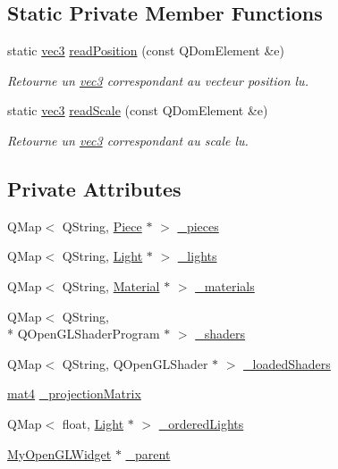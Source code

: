 \subsection*{Static Private Member Functions}
\begin{DoxyCompactItemize}
\item 
static \hyperlink{structvec3}{vec3} \hyperlink{class_scene_a98d11f40f1ac651eae91827ae9ef3d5c}{read\+Position} (const Q\+Dom\+Element \&e)
\begin{DoxyCompactList}\small\item\em Retourne un \hyperlink{structvec3}{vec3} correspondant au vecteur position lu. \end{DoxyCompactList}\item 
static \hyperlink{structvec3}{vec3} \hyperlink{class_scene_a2ea5cfec3f9be76fe110cba255621d7e}{read\+Scale} (const Q\+Dom\+Element \&e)
\begin{DoxyCompactList}\small\item\em Retourne un \hyperlink{structvec3}{vec3} correspondant au scale lu. \end{DoxyCompactList}\end{DoxyCompactItemize}
\subsection*{Private Attributes}
\begin{DoxyCompactItemize}
\item 
Q\+Map$<$ Q\+String, \hyperlink{class_piece}{Piece} $\ast$ $>$ \hyperlink{class_scene_aa3a488d4be41fe6a187488e1e7a1035c}{\+\_\+pieces}
\item 
Q\+Map$<$ Q\+String, \hyperlink{class_light}{Light} $\ast$ $>$ \hyperlink{class_scene_a0ef33120973d6afc1754d2154d7c338a}{\+\_\+lights}
\item 
Q\+Map$<$ Q\+String, \hyperlink{class_material}{Material} $\ast$ $>$ \hyperlink{class_scene_a5b96810fdeb47632d5ce6c2c47f41691}{\+\_\+materials}
\item 
Q\+Map$<$ Q\+String, \\*
Q\+Open\+G\+L\+Shader\+Program $\ast$ $>$ \hyperlink{class_scene_abde34dc03c8d3a07b3177041ab195f07}{\+\_\+shaders}
\item 
Q\+Map$<$ Q\+String, Q\+Open\+G\+L\+Shader $\ast$ $>$ \hyperlink{class_scene_a57117e4269465f070fb412f338d28bf4}{\+\_\+loaded\+Shaders}
\item 
\hyperlink{structmat4}{mat4} \hyperlink{class_scene_a7db3394191c0a07e6bdc456a53ac8ece}{\+\_\+projection\+Matrix}
\item 
Q\+Map$<$ float, \hyperlink{class_light}{Light} $\ast$ $>$ \hyperlink{class_scene_a5fae715ba6bdde7c382f9d779095a718}{\+\_\+ordered\+Lights}
\item 
\hyperlink{class_my_open_g_l_widget}{My\+Open\+G\+L\+Widget} $\ast$ \hyperlink{class_scene_ae394dcdd910d007d32a6aa3869d693e6}{\+\_\+parent}
\end{DoxyCompactItemize}


